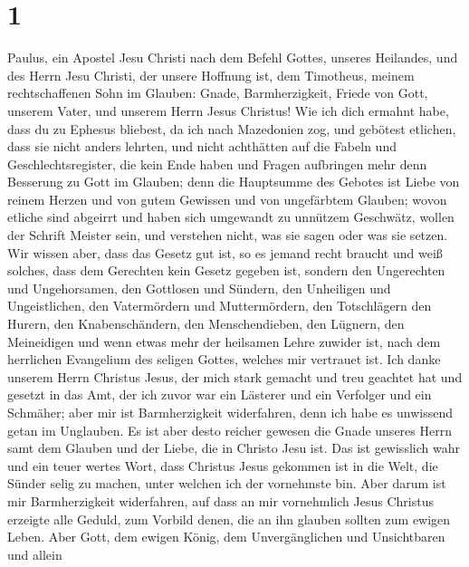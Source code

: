 \hypertarget{section}{%
\section{1}\label{section}}

 Paulus, ein Apostel Jesu Christi nach dem Befehl Gottes,
unseres Heilandes, und des Herrn Jesu Christi, der unsere Hoffnung ist,
 dem Timotheus, meinem rechtschaffenen Sohn im Glauben:
Gnade, Barmherzigkeit, Friede von Gott, unserem Vater, und unserem Herrn
Jesus Christus!  Wie ich dich ermahnt habe, dass du zu
Ephesus bliebest, da ich nach Mazedonien zog, und gebötest etlichen,
dass sie nicht anders lehrten,  und nicht achthätten auf die
Fabeln und Geschlechtsregister, die kein Ende haben und Fragen
aufbringen mehr denn Besserung zu Gott im Glauben;  denn die
Hauptsumme des Gebotes ist Liebe von reinem Herzen und von gutem
Gewissen und von ungefärbtem Glauben;  wovon etliche sind
abgeirrt und haben sich umgewandt zu unnützem Geschwätz, 
wollen der Schrift Meister sein, und verstehen nicht, was sie sagen oder
was sie setzen.  Wir wissen aber, dass das Gesetz gut ist,
so es jemand recht braucht  und weiß solches, dass dem
Gerechten kein Gesetz gegeben ist, sondern den Ungerechten und
Ungehorsamen, den Gottlosen und Sündern, den Unheiligen und
Ungeistlichen, den Vatermördern und Muttermördern, den Totschlägern
 den Hurern, den Knabenschändern, den Menschendieben, den
Lügnern, den Meineidigen und wenn etwas mehr der heilsamen Lehre zuwider
ist,  nach dem herrlichen Evangelium des seligen Gottes,
welches mir vertrauet ist.  Ich danke unserem Herrn
Christus Jesus, der mich stark gemacht und treu geachtet hat und gesetzt
in das Amt,  der ich zuvor war ein Lästerer und ein
Verfolger und ein Schmäher; aber mir ist Barmherzigkeit widerfahren,
denn ich habe es unwissend getan im Unglauben.  Es ist aber
desto reicher gewesen die Gnade unseres Herrn samt dem Glauben und der
Liebe, die in Christo Jesu ist.  Das ist gewisslich wahr
und ein teuer wertes Wort, dass Christus Jesus gekommen ist in die Welt,
die Sünder selig zu machen, unter welchen ich der vornehmste bin.
 Aber darum ist mir Barmherzigkeit widerfahren, auf dass an
mir vornehmlich Jesus Christus erzeigte alle Geduld, zum Vorbild denen,
die an ihn glauben sollten zum ewigen Leben.  Aber Gott,
dem ewigen König, dem Unvergänglichen und Unsichtbaren und allein
